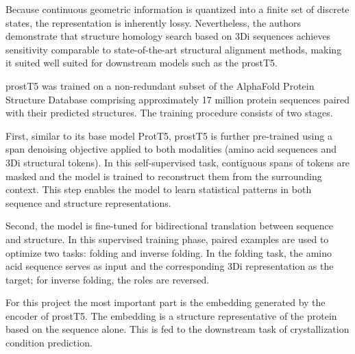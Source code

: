 Because continuous geometric information is quantized into a finite set of discrete states, the representation is inherently lossy. Nevertheless, the authors demonstrate that structure homology search based on 3Di sequences achieves sensitivity comparable to state-of-the-art structural alignment methods, making it suited well suited for downstream models such as the \gls{prostT5}.

\gls{prostT5} was trained on a non-redundant subset of the AlphaFold Protein Structure Database comprising approximately 17 million protein sequences paired with their predicted structures. The training procedure consists of two stages.

First, similar to its base model ProtT5, \gls{prostT5} is further pre-trained using a span denoising objective applied to both modalities (amino acid sequences and 3Di structural tokens). In this self-supervised task, contiguous spans of tokens are masked and the model is trained to reconstruct them from the surrounding context. This step enables the model to learn statistical patterns in both sequence and structure representations.

Second, the model is fine-tuned for bidirectional translation between sequence and structure. In this supervised training phase, paired examples are used to optimize two tasks: folding and inverse folding. In the folding task, the amino acid sequence serves as input and the corresponding 3Di representation as the target; for inverse folding, the roles are reversed.

For this project the most important part is the embedding generated by the encoder of \gls{prostT5}. The embedding is a structure representative of the protein based on the sequence alone. This is fed to the downstream task of crystallization condition prediction. 

